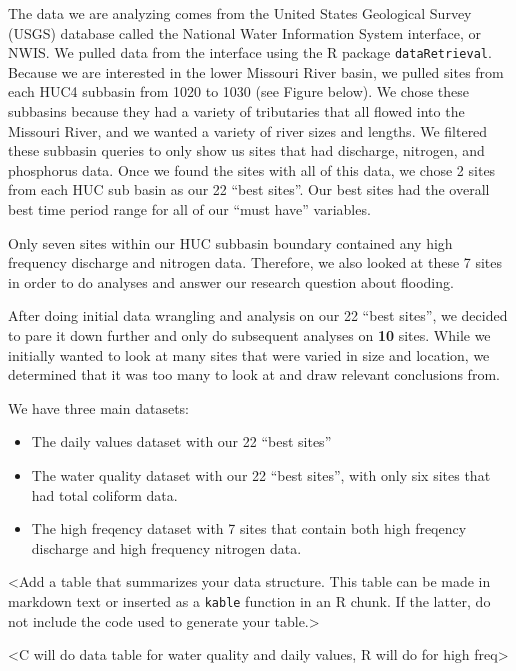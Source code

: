 \documentclass[12pt,]{article}
\begin{document}
The data we are analyzing comes from the United States Geological Survey
(USGS) database called the National Water Information System interface,
or NWIS. We pulled data from the interface using the R package
\texttt{dataRetrieval}. Because we are interested in the lower Missouri
River basin, we pulled sites from each HUC4 subbasin from 1020 to 1030
(see Figure below). We chose these subbasins because they had a variety
of tributaries that all flowed into the Missouri River, and we wanted a
variety of river sizes and lengths. We filtered these subbasin queries
to only show us sites that had discharge, nitrogen, and phosphorus data.
Once we found the sites with all of this data, we chose 2 sites from
each HUC sub basin as our 22 ``best sites''. Our best sites had the
overall best time period range for all of our ``must have'' variables.

Only seven sites within our HUC subbasin boundary contained any high
frequency discharge and nitrogen data. Therefore, we also looked at
these 7 sites in order to do analyses and answer our research question
about flooding.

After doing initial data wrangling and analysis on our 22 ``best
sites'', we decided to pare it down further and only do subsequent
analyses on \textbf{10} sites. While we initially wanted to look at many
sites that were varied in size and location, we determined that it was
too many to look at and draw relevant conclusions from.

We have three main datasets:

\begin{itemize}
\item
  The daily values dataset with our 22 ``best sites''
\item
  The water quality dataset with our 22 ``best sites'', with only six
  sites that had total coliform data.
\item
  The high freqency dataset with 7 sites that contain both high freqency
  discharge and high frequency nitrogen data.
\end{itemize}

\textless{}Add a table that summarizes your data structure. This table
can be made in markdown text or inserted as a \texttt{kable} function in
an R chunk. If the latter, do not include the code used to generate your
table.\textgreater{}

\textless{}C will do data table for water quality and daily values, R
will do for high freq\textgreater{}
\end{document}
